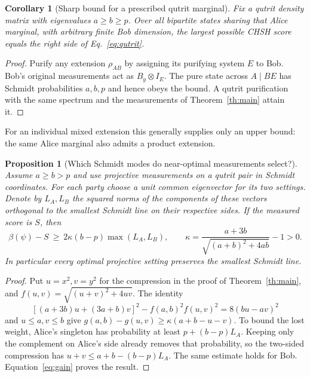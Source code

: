 \documentclass[11pt]{article}
\newtheorem{corollary}[theorem]{Corollary}
\newtheorem{proposition}[theorem]{Proposition}
\begin{document}
\begin{corollary}[Sharp bound for a prescribed qutrit marginal]\label{cor:mixed}
Fix a qutrit density matrix with eigenvalues $a\ge b\ge p$. Over all bipartite states sharing that Alice marginal, with arbitrary finite Bob dimension, the largest possible CHSH score equals the right side of Eq.~\eqref{eq:qutrit}.
\end{corollary}
\begin{proof}
Purify any extension $\rho_{AB}$ by assigning its purifying system $E$ to Bob. Bob's original measurements act as $B_y\otimes I_E$. The pure state across $A\mid BE$ has Schmidt probabilities $a,b,p$ and hence obeys the bound. A qutrit purification with the same spectrum and the measurements of Theorem~\ref{th:main} attain it.
\end{proof}
For an individual mixed extension this generally supplies only an upper bound: the same Alice marginal also admits a product extension.

\begin{proposition}[Which Schmidt modes do near-optimal measurements select?]\label{prop:rigid}
Assume $a\ge b>p$ and use projective measurements on a qutrit pair in Schmidt coordinates. For each party choose a unit common eigenvector for its two settings. Denote by $L_A,L_B$ the squared norms of the components of these vectors orthogonal to the smallest Schmidt line on their respective sides. If the measured score is $S$, then
\begin{equation}
 \beta(\psi)-S\ \ge\ 2\kappa(b-p)\max(L_A,L_B),\qquad
 \kappa=\frac{a+3b}{\sqrt{(a+b)^2+4ab}}-1>0.             \label{eq:rigid}
\end{equation}
In particular every optimal projective setting preserves the smallest Schmidt line.
\end{proposition}
\begin{proof}
Put $u=x^2,v=y^2$ for the compression in the proof of Theorem~\ref{th:main}, and $f(u,v)=\sqrt{(u+v)^2+4uv}$. The identity
\[
 [(a+3b)u+(3a+b)v]^2-f(a,b)^2 f(u,v)^2=8(bu-av)^2
\]
and $u\le a,v\le b$ give $g(a,b)-g(u,v)\ge\kappa(a+b-u-v)$. To bound the lost weight, Alice's singleton has probability at least $p+(b-p)L_A$. Keeping only the complement on Alice's side already removes that probability, so the two-sided compression has $u+v\le a+b-(b-p)L_A$. The same estimate holds for Bob. Equation~\eqref{eq:gain} proves the result.
\end{proof}
\end{document}
